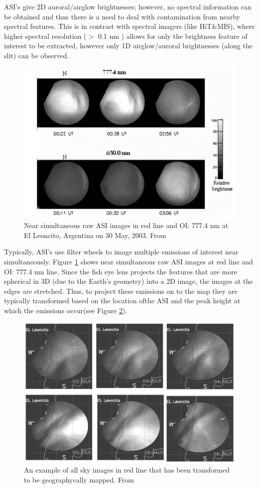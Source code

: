 \documentclass[crop=false,class=mitthesis,oneside,font=12pt]{standalone}
\begin{document}
ASI's give 2D auroral/airglow brightnesses; however, no spectral information can be obtained and thus there is a need to deal with contamination from nearby spectral features. This is in contrast with spectral imagers (like HiT\&MIS), where higher spectral resolution ($>$ 0.1 nm ) allows for only the brightness feature of interest to be extracted, however only 1D airglow/auroral brightnesses (along the slit) can be observed.
\begin{figure}[H]
	\centering\includegraphics[width=30pc]{asi_mul.png}
	\caption{Near simultaneous raw ASI images in red line and OI: 777.4 nm at El Leoncito, Argentina on 30 May, 2003. From \cite{martinis2006imaging}  }
	\label{fig:asi_mult}
\end{figure}

Typically, ASI's use filter wheels to image multiple emissions of interest near simultaneously. Figure \ref{fig:asi_mult} shows near simultaneous raw ASI images at red line and OI: 777.4 nm line. Since the fish eye lens projects the features that are more spherical in 3D (due to the Earth's geometry) into a 2D image, the images at the edges are stretched. Thus, to project these emissions on to the map they are typically transformed based on the location ofthe ASI and the peak height at which the emissions occur(see Figure \ref{fig:asi_urap}).

\begin{figure}[H]
	\centering\includegraphics[width=30pc]{asi_urap.png}
	\caption{An example of all sky images in red line that has been transformed to be geographycally mapped. From \cite{martinis2006imaging} }
	\label{fig:asi_urap}
\end{figure}
\end{document}
